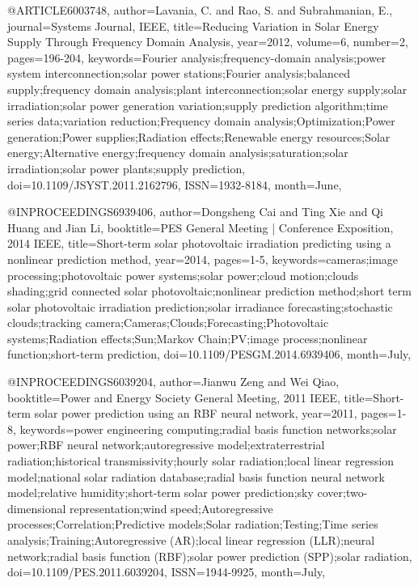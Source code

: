 {@ARTICLE{6003748, 
author={Lavania, C. and Rao, S. and Subrahmanian, E.}, 
journal={Systems Journal, IEEE}, 
title={Reducing Variation in Solar Energy Supply Through Frequency Domain Analysis}, 
year={2012}, 
volume={6}, 
number={2}, 
pages={196-204}, 
keywords={Fourier analysis;frequency-domain analysis;power system interconnection;solar power stations;Fourier analysis;balanced supply;frequency domain analysis;plant interconnection;solar energy supply;solar irradiation;solar power generation variation;supply prediction algorithm;time series data;variation reduction;Frequency domain analysis;Optimization;Power generation;Power supplies;Radiation effects;Renewable energy resources;Solar energy;Alternative energy;frequency domain analysis;saturation;solar irradiation;solar power plants;supply prediction}, 
doi={10.1109/JSYST.2011.2162796}, 
ISSN={1932-8184}, 
month={June},}

@INPROCEEDINGS{6939406, 
author={Dongsheng Cai and Ting Xie and Qi Huang and Jian Li}, 
booktitle={PES General Meeting | Conference Exposition, 2014 IEEE}, 
title={Short-term solar photovoltaic irradiation predicting using a nonlinear prediction method}, 
year={2014}, 
pages={1-5}, 
keywords={cameras;image processing;photovoltaic power systems;solar power;cloud motion;clouds shading;grid connected solar photovoltaic;nonlinear prediction method;short term solar photovoltaic irradiation prediction;solar irradiance forecasting;stochastic clouds;tracking camera;Cameras;Clouds;Forecasting;Photovoltaic systems;Radiation effects;Sun;Markov Chain;PV;image process;nonlinear function;short-term prediction}, 
doi={10.1109/PESGM.2014.6939406}, 
month={July},}

@INPROCEEDINGS{6039204, 
author={Jianwu Zeng and Wei Qiao}, 
booktitle={Power and Energy Society General Meeting, 2011 IEEE}, 
title={Short-term solar power prediction using an RBF neural network}, 
year={2011}, 
pages={1-8}, 
keywords={power engineering computing;radial basis function networks;solar power;RBF neural network;autoregressive model;extraterrestrial radiation;historical transmissivity;hourly solar radiation;local linear regression model;national solar radiation database;radial basis function neural network model;relative humidity;short-term solar power prediction;sky cover;two-dimensional representation;wind speed;Autoregressive processes;Correlation;Predictive models;Solar radiation;Testing;Time series analysis;Training;Autoregressive (AR);local linear regression (LLR);neural network;radial basis function (RBF);solar power prediction (SPP);solar radiation}, 
doi={10.1109/PES.2011.6039204}, 
ISSN={1944-9925}, 
month={July},}

}
